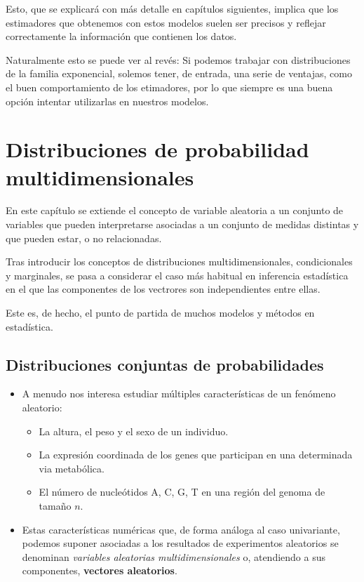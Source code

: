 \documentclass[
]{article}
\providecommand{\tightlist}{%
  \setlength{\itemsep}{0pt}\setlength{\parskip}{0pt}}
\begin{document}
Esto, que se explicará con más detalle en capítulos siguientes, implica que los estimadores que obtenemos con estos modelos suelen ser precisos y reflejar correctamente la información que contienen los datos.

Naturalmente esto se puede ver al revés: Si podemos trabajar con distribuciones de la familia exponencial, solemos tener, de entrada, una serie de ventajas, como el buen comportamiento de los etimadores, por lo que siempre es una buena opción intentar utilizarlas en nuestros modelos.

\section{Distribuciones de probabilidad multidimensionales}\label{distribuciones-de-probabilidad-multidimensionales}

En este capítulo se extiende el concepto de variable aleatoria a un conjunto de variables que pueden interpretarse asociadas a un conjunto de medidas distintas y que pueden estar, o no relacionadas.

Tras introducir los conceptos de distribuciones multidimensionales, condicionales y marginales, se pasa a considerar el caso más habitual en inferencia estadística en el que las componentes de los vectrores son independientes entre ellas.

Este es, de hecho, el punto de partida de muchos modelos y métodos en estadística.

\subsection{Distribuciones conjuntas de probabilidades}\label{distribuciones-conjuntas-de-probabilidades}

\begin{itemize}
\item
  A menudo nos interesa estudiar múltiples características de un fenómeno aleatorio:

  \begin{itemize}
  \tightlist
  \item
    La altura, el peso y el sexo de un individuo.
  \item
    La expresión coordinada de los genes que participan en una determinada via metabólica.
  \item
    El número de nucleótidos A, C, G, T en una región del genoma de tamaño \(n\).
  \end{itemize}
\item
  Estas características numéricas que, de forma análoga al caso univariante, podemos suponer asociadas a los resultados de experimentos aleatorios se denominan \emph{variables aleatorias multidimensionales} o, atendiendo a sus componentes, \textbf{vectores aleatorios}.
\end{itemize}
\end{document}
